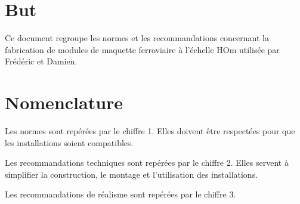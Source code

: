 
\section{But}

Ce document regroupe les normes et les recommandations concernant la fabrication de modules de maquette ferroviaire à l’échelle HOm utilisée par Frédéric et Damien.

\section{Nomenclature}


Les normes sont repérées par le chiffre 1. 
Elles doivent être respectées pour que les installations soient compatibles.

Les recommandations techniques sont repérées par le chiffre 2. 
Elles servent à simplifier la construction, le montage et l'utilisation des installations.

Les recommandations de réalisme sont repérées par le chiffre 3.